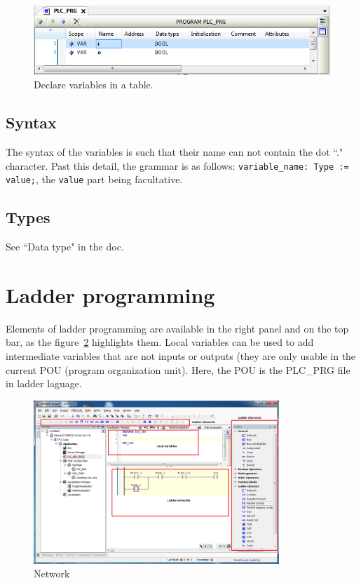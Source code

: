 \documentclass[10pt,a4paper]{article}
\begin{document}
\begin{figure}[h!]
	\center
	\includegraphics[width=.8\textwidth]{var-tab}
	\caption{Declare variables in a table.}
	\label{fig:var-tab}
\end{figure}

\subsection{Syntax}
The syntax of the variables is such that their name can not contain the dot ``." character.
Past this detail, the grammar is as follows: \texttt{variable\_name: Type := value;}, the \texttt{value} part being facultative.

\subsection{Types}
See ``Data type" in the doc.


\section{Ladder programming}

Elements of ladder programming are available in the right panel and on the top bar, as the figure~\ref{fig:network} highlights them.
Local variables can be used to add intermediate variables that are not inputs or outputs (they are only usable in the current POU (program organization unit). Here, the POU is the PLC\_PRG file in ladder laguage.

\begin{figure}[h!]
	\begin{center}
		\includegraphics[width=350px]{img7.PNG}
	\end{center}
\caption{Network}
\label{fig:network}
\end{figure}
\end{document}
